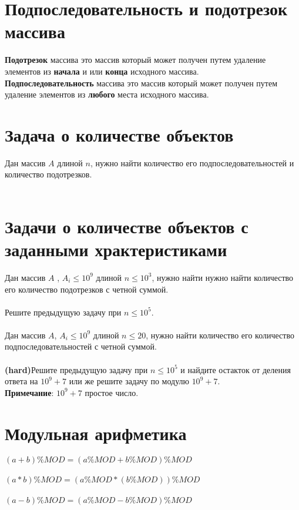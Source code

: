 \documentclass[10pt]{article}
\begin{document}
    \section{Подпоследовательность и подотрезок массива}
       \textbf{Подотрезок} массива это массив который может получен путем удаление элементов из \textbf{начала} и или \textbf{конца} исходного массива.
       \vspace{5mm}
       \\
    \textbf{Подпоследовательность} массива это массив который может получен путем удаление элементов из \textbf{любого} места исходного массива.
    
    \section{Задача о количестве объектов}
    
    Дан массив $A$ длиной $n$, нужно найти количество его  подпоследовательностей и количество подотрезков.
    \\
    \\
    
    
    \section{Задачи о количестве объектов с заданными храктеристиками}
    
    Дан массив $A$ , $A_i \leq 10^9$ длиной $n \leq {10^3}$, нужно найти нужно найти количество его  количество подотрезков с четной суммой.
    \\
    \\
    Решите предыдущую задачу при $n \leq {10^5}$.
    \\
    \\
    Дан массив $A$, $A_i \leq 10^9$ длиной $n \leq {20}$, нужно найти количество его  количество подпоследовательностей с четной суммой.
    \\
    \\
    \textbf{(hard)}Решите предыдущую задачу при $n \leq {10^5}$ и найдите остакток от деления ответа на $10^9 + 7$ или же решите задачу по модулю $10^9 + 7$.
    \\
    \textbf{Примечание}:  $10^9 + 7$ простое число.
    \section{Модульная арифметика}
        $(a + b)\%MOD = (a\%MOD + b\%MOD)\%MOD$
        \\
        \\
        $(a * b)\%MOD = (a\%MOD * (b\%MOD))\%MOD$
        \\
        \\
        $(a - b)\%MOD = (a\%MOD - b\%MOD)\%MOD$
        
\end{document}
